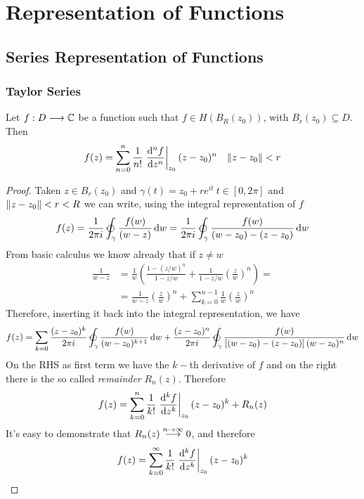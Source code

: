\documentclass[../complete.tex]{subfiles}
\begin{document}
\chapter{Representation of Functions}
\section{Series Representation of Functions}
\subsection{Taylor Series}
\begin{thm}
	Let $f:D\fto\Cf$ be a function such that $f\in H(B_R(z_0))$, with $B_r(z_0)\subseteq D$. Then
	\begin{equation}
		f(z)=\sum_{n=0}^n\frac{1}{n!}\left.\derivative[n]{f}{z}\right|_{z_0}(z-z_0)^n\quad\norm{z-z_0}<r
		\label{eq:taylor}
	\end{equation}
\end{thm}
\begin{proof}
	Taken $z\in B_r(z_0)$ and $\gamma(t)=z_0+re^{it}\ t\in[0,2\pi]$ and $\norm{z-z_0}<r<R$ we can write, using the integral representation of $f$
	\begin{equation*}
		f(z)=\frac{1}{2\pi i}\ointccw_{\gamma}\frac{f(w)}{(w-z)}\diff w=\frac{1}{2\pi i}\ointccw_{\gamma}\frac{f(w)}{(w-z_0)-(z-z_0)}\diff w
	\end{equation*}
	From basic calculus we know already that if $z\ne w$
	\begin{equation*}
		\begin{aligned}
			\frac{1}{w-z}&=\frac{1}{w}\left( \frac{1-(z/w)^n}{1-z/w}+\frac{1}{1-z/w}\left( \frac{z}{w} \right)^n \right)=\\
			&=\frac{1}{w-z}\left( \frac{z}{w} \right)^n+\sum_{k=0}^{n-1}\frac{1}{w}\left( \frac{z}{w} \right)^n
		\end{aligned}
	\end{equation*}
	Therefore, inserting it back into the integral representation, we have
	\begin{equation*}
		f(z)=\sum_{k=0}\frac{(z-z_0)^k}{2\pi i}\ointccw_{\gamma}\frac{f(w)}{(w-z_0)^{k+1}}\diff w+\frac{(z-z_0)^n}{2\pi i}\ointccw_\gamma\frac{f(w)}{\left[ (w-z_0)-(z-z_0) \right](w-z_0)^n}\diff w
	\end{equation*}
	On the RHS as first term we have the $k-$th derivative of $f$ and on the right there is the so called \textit{remainder} $R_n(z)$. Therefore
	\begin{equation*}
		f(z)=\sum_{k=0}^{n}\frac{1}{k!}\left.\derivative[k]{f}{z}\right|_{z_0}(z-z_0)^k+R_n(z)
	\end{equation*}
	It's easy to demonstrate that $R_n(z)\fto[n\to\infty]0$, and therefore
	\begin{equation*}
		f(z)=\sum_{k=0}^\infty\frac{1}{k!}\left.\derivative[k]{f}{z}\right|_{z_0}(z-z_0)^k
	\end{equation*}
\end{proof}
\end{document}
